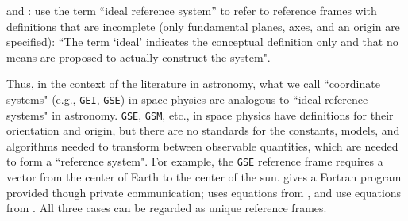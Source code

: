 \documentclass[draft]{agujournal2019}
\begin{document}
 and : use the term ``ideal reference system'' to refer to reference frames with definitions that are incomplete (only fundamental planes, axes, and an origin are specified): ``The term `ideal' indicates the conceptual definition only and that no means are proposed to actually construct the system".



Thus, in the context of the literature in astronomy, what we call ``coordinate systems" (e.g., \texttt{GEI}, \texttt{GSE}) in space physics are analogous to ``ideal reference systems" in astronomy.  \texttt{GSE}, \texttt{GSM}, etc., in space physics have definitions for their orientation and origin, but there are no standards for the constants, models, and algorithms needed to transform between observable quantities, which are needed to form a ``reference system". For example, the \texttt{GSE} reference frame requires a vector from the center of Earth to the center of the sun.  gives a Fortran program provided though private communication;  uses equations from , and 
 use equations from . All three cases can be regarded as unique reference frames.
\end{document}
